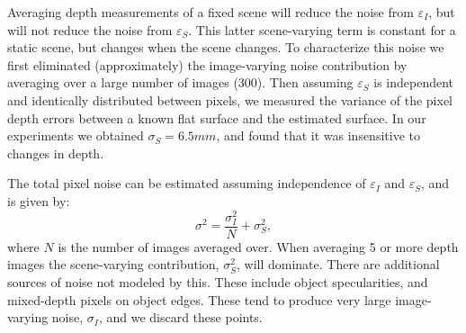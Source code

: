Averaging depth measurements of a fixed scene will reduce the noise from $\varepsilon_I$, but will not reduce the noise from $\varepsilon_S$.  This latter scene-varying term is constant for a static scene, but changes when the scene changes.  To characterize this noise we first eliminated (approximately) the image-varying noise contribution by averaging over a large number of images (300).  Then assuming $\varepsilon_S$ is independent and identically distributed between pixels, we measured the variance of the pixel depth errors between a known flat surface and the estimated surface.  In our experiments we obtained $\sigma_S=6.5mm$, and found that it was insensitive to changes in depth.

The total pixel noise can be estimated assuming independence of $\varepsilon_I$ and $\varepsilon_S$, and is given by:
\begin{equation}
\sigma^2 = \frac{\sigma_I^2}{N} + \sigma_S^2,\label{eq:sigma}
\end{equation}
where $N$ is the number of images averaged over.  When averaging 5 or more depth images the scene-varying contribution, $\sigma_S^2$, will dominate.  There are additional sources of noise not modeled by this.  These include object specularities, and mixed-depth pixels on object edges.  These tend to produce very large image-varying noise, $\sigma_I$, and we discard these points.  


